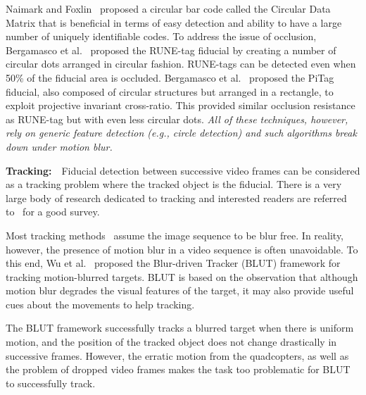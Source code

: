 Naimark and Foxlin~\cite{NaimarkF02} proposed a circular bar code
called the Circular Data Matrix that is beneficial in terms of easy
detection and ability to have a large number of uniquely identifiable
codes.  To address the issue of occlusion, Bergamasco et
al.~\cite{runetag11} proposed the RUNE-tag fiducial by creating a
number of circular dots arranged in circular fashion. RUNE-tags can be
detected even when 50\% of the fiducial area is occluded. Bergamasco
et al.~\cite{Pitag13} proposed the PiTag fiducial, also composed of
circular structures but arranged in a rectangle, to exploit projective
invariant cross-ratio.  This provided similar occlusion resistance as
RUNE-tag but with even less circular dots. {\it All of these techniques,
however, rely on generic feature detection (e.g., circle detection)
and such algorithms break down under motion blur.}


{\textbf{Tracking:}}~~Fiducial detection between successive video
frames can be considered as a tracking problem where the tracked
object is the fiducial.  There is a very large body of research
dedicated to tracking and interested readers are referred
to~\cite{Yilmaz:2006} for a good survey.

Most tracking methods~\cite{Ross:2008,Wu:2009,Perez02,Mei:2009} assume
the image sequence to be blur free. In reality, however, the presence
of motion blur in a video sequence is often unavoidable. To this end,
Wu et al.~\cite{Wu:2011} proposed the Blur-driven Tracker (BLUT)
framework for tracking motion-blurred targets. BLUT is based on the
observation that although motion blur degrades the visual features of
the target, it may also provide useful cues about the movements to
help tracking.

The BLUT framework successfully tracks a blurred target when there is
uniform motion, and the position of the tracked object does not change
drastically in successive frames. However, the erratic motion from the
quadcopters, as well as the problem of dropped video frames makes the task too
problematic for BLUT to successfully track.
